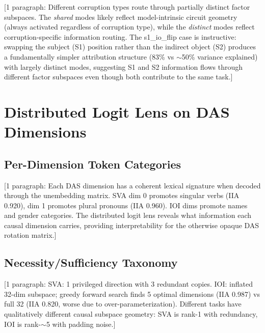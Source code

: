 \documentclass[11pt]{article}
\begin{document}
[1 paragraph: Different corruption types route through partially
distinct factor subspaces. The \emph{shared} modes likely reflect
model-intrinsic circuit geometry (always activated regardless of
corruption type), while the \emph{distinct} modes reflect
corruption-specific information routing. The s1\_io\_flip case is
instructive: swapping the subject (S1) position rather than the indirect
object (S2) produces a fundamentally simpler attribution structure
(83\% vs $\sim$50\% variance explained) with largely distinct modes,
suggesting S1 and S2 information flows through different factor subspaces
even though both contribute to the same task.]



\section{Distributed Logit Lens on DAS Dimensions}
\label{app:logitlens}


\subsection{Per-Dimension Token Categories}

[1 paragraph: Each DAS dimension has a coherent lexical signature when
decoded through the unembedding matrix. SVA dim 0 promotes singular
verbs (IIA 0.920), dim 1 promotes plural pronouns (IIA 0.960). IOI
dims promote names and gender categories. The distributed logit lens
reveals what information each causal dimension carries, providing
interpretability for the otherwise opaque DAS rotation matrix.]

\subsection{Necessity/Sufficiency Taxonomy}

[1 paragraph: SVA: 1 privileged direction with 3 redundant copies.
IOI: inflated 32-dim subspace; greedy forward search finds 5 optimal
dimensions (IIA 0.987) vs full 32 (IIA 0.820, worse due to
over-parameterization). Different tasks have qualitatively different
causal subspace geometry: SVA is rank-1 with redundancy, IOI is
rank-$\sim$5 with padding noise.]
\end{document}
